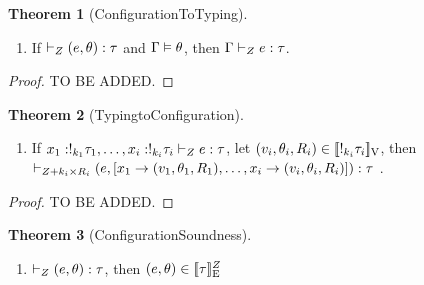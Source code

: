 \documentclass[a4paper,11pt]{article}
\theoremstyle{definition}
\newtheorem{thm}{Theorem}
\begin{document}
\begin{thm}[ConfigurationToTyping]
  \label{sound}
  \begin{enumerate} 
   \item If $ \vdash_{Z}  ( e, \theta) : \tau $ and $\Gamma \vDash
     \theta $, then $ \Gamma \vdash_{Z} e: \tau
     $.
  \end{enumerate}
\end{thm}
\begin{proof}
  TO BE ADDED.
\end{proof}

\begin{thm}[TypingtoConfiguration]
  \label{sound}
  \begin{enumerate} 
   \item If $ x_1: !_{k_1} \tau_1, \ldots ,  x_i : !_{k_i} \tau_i
     \vdash_{Z} e: \tau$,  let $  (v_i, \theta_i,
     R_i) \in [\![  !_{k_i} \tau_i  ]\!]_{\text{V}}   $,  then   $
     \vdash_{Z + k_i \times R_i}
     ( e, [ x_1 \to (v_1, \theta_1, R_1), \ldots,  x_i \to (v_i, \theta_i, R_i)   ] ) : \tau $ .
  \end{enumerate}
\end{thm}
\begin{proof}
  TO BE ADDED.
 \end{proof} 



\begin{thm}[ConfigurationSoundness]
  \label{sound}
  \begin{enumerate} 
   \item $ \vdash_{Z}  ( e, \theta) : \tau $, then $(
     e, \theta) \in  [\![  \tau ]\!]_{\text{E}}^{ Z} $
  \end{enumerate}
\end{thm}



\end{document}
